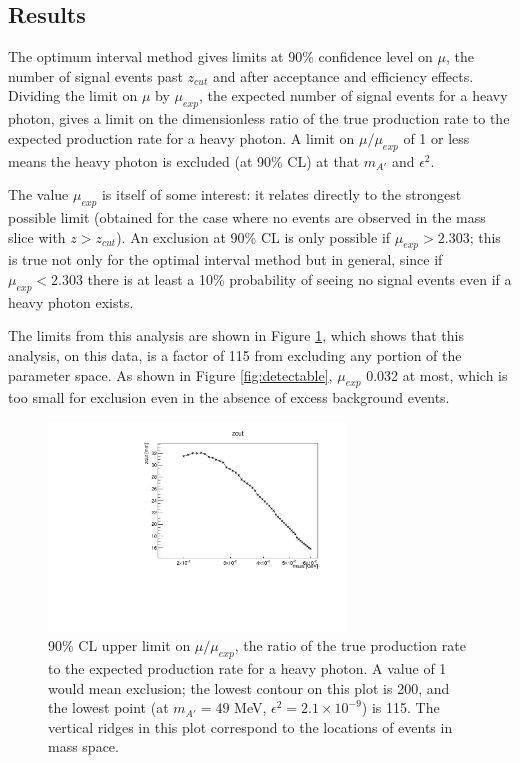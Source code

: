 \subsection{Results}
\label{sec:results}
The optimum interval method gives limits at 90\% confidence level on $\mu$, the number of signal events past $z_{cut}$ and after acceptance and efficiency effects.
Dividing the limit on $\mu$ by $\mu_{exp}$, the expected number of signal events for a heavy photon, gives a limit on the dimensionless ratio of the true production rate to the expected production rate for a heavy photon.
A limit on $\mu/\mu_{exp}$ of 1 or less means the heavy photon is excluded (at 90\% CL) at that $m_{A'}$ and $\epsilon^2$.

The value $\mu_{exp}$ is itself of some interest: it relates directly to the strongest possible limit (obtained for the case where no events are observed in the mass slice with $z>z_{cut}$).
An exclusion at 90\% CL is only possible if $\mu_{exp}>2.303$; this is true not only for the optimal interval method but in general, since if $\mu_{exp}<2.303$ there is at least a 10\% probability of seeing no signal events even if a heavy photon exists.

The limits from this analysis are shown in Figure \ref{fig:upper_limit}, which shows that this analysis, on this data, is a factor of 115 from excluding any portion of the parameter space.
As shown in Figure \ref{fig:detectable}, $\mu_{exp}$ 0.032 at most, which is too small for exclusion even in the absence of excess background events.

\begin{figure}[ht]
\begin{center}
    \includegraphics[width=0.7\textwidth,page=15,angle=-90]{vertexing/figs/golden_mres_output}
\end{center}
\caption{90\% CL upper limit on $\mu/\mu_{exp}$, the ratio of the true production rate to the expected production rate for a heavy photon. A value of 1 would mean exclusion; the lowest contour on this plot is 200, and the lowest point (at $m_{A'}=49$ MeV, $\epsilon^2=2.1\times 10^{-9}$) is 115.
    The vertical ridges in this plot correspond to the locations of events in mass space.}
    \label{fig:upper_limit}
\end{figure}

